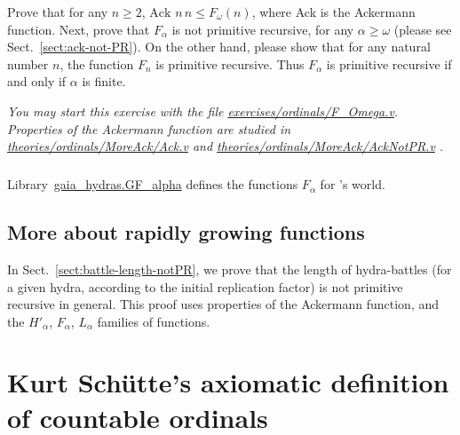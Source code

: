 \begin{exercise}



Prove that for any $n\geq 2$, $\textrm{Ack}\,\,n\,n\leq  F_\omega(n)$, where \textrm{Ack} is the Ackermann function. Next, prove that $F_\alpha$ is not primitive recursive, for any $\alpha\geq\omega$  (please see Sect.~\vref{sect:ack-not-PR}).
On the other hand, please show that for any natural number $n$, the function $F_n$ is primitive recursive.
Thus $F_\alpha$ is primitive recursive if and only if $\alpha$ is finite.

\emph{You may start this exercise with the file
    \href{https://github.com/coq-community/hydra-battles/tree/master/exercises/ordinals/F_omega.v}{exercises/ordinals/F\_Omega.v}.
Properties of the Ackermann function are studied in
    \href{https://github.com/coq-community/hydra-battles/tree/master/theories/ordinals/MoreAck/Ack.v}{theories/ordinals/MoreAck/Ack.v} and
    \href{https://github.com/coq-community/hydra-battles/tree/master/theories/ordinals/MoreAck/AckNotPR.v}{theories/ordinals/MoreAck/AckNotPR.v}
.}
\end{exercise} 

\paragraph*{\gaiasign} Library~\href{../theories/html/gaia_hydras.GF_alpha.html}{gaia\_hydras.GF\_alpha}  defines the functions $F_\alpha$ for \gaia's world.


\section{More about rapidly growing functions}

In Sect.~\vref{sect:battle-length-notPR}, we prove that the length of hydra-battles (for a given hydra, according to the initial replication factor) is not primitive recursive in general. 
This proof uses properties of the Ackermann function, and the $H'_\alpha$, $F_\alpha$, $L_\alpha$ families of functions.










\chapter[Countable ordinals (after Sch\"{u}tte)]{Kurt Schütte's axiomatic definition of countable ordinals}

